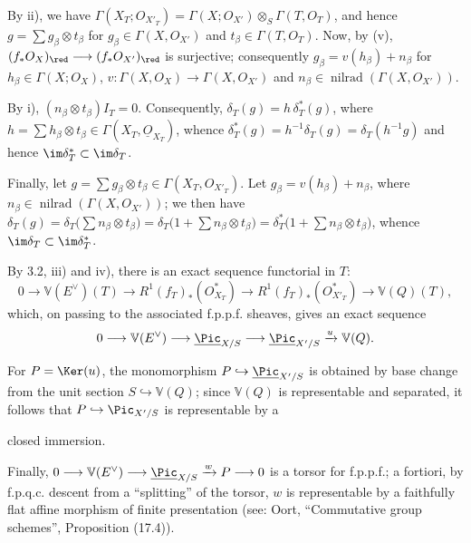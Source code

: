 By ii), we have \(\Gamma(X_T;{O}_{X'_T})=\Gamma(X;{O}_{X'})\otimes_S\Gamma(T,{O}_T)\), and hence \(g=\sum g_\beta\otimes t_\beta\) for \(g_\beta\in\Gamma(X,{O}_{X'})\) and \(t_\beta\in\Gamma(T,{O}_T)\). Now, by (v), \((f_*{O}_X)_{\red}\longrightarrow(f_*{O}_{X'})_{\red}\) is surjective; consequently \(g_\beta=v(h_\beta)+n_\beta\) for \(h_\beta\in\Gamma(X;{O}_X)\), \(v:\Gamma(X,{O}_X)\to
\Gamma(X,{O}_{X'})\) and \(n_\beta\in\operatorname{nilrad}(\Gamma(X,{O}_{X'}))\).

By i), \((n_\beta\otimes t_\beta)I_T=0\). Consequently, \(\delta_T(g)=h\,\delta_T^*(g)\), where \(h=\sum h_\beta\otimes t_\beta\in\Gamma(X_T,\underline{O}_{X_T})\), whence \(\delta_T^*(g)=h^{-1}\delta_T(g)=\delta_T(h^{-1}g)\) and hence \(\im\delta_T^*\subset\im\delta_T\).

Finally, let \(g=\sum g_\beta\otimes t_\beta\in
\Gamma(X_T,{O}_{X'_T})\). Let \(g_\beta=v(h_\beta)+n_\beta\), where \(n_\beta\in\operatorname{nilrad}(\Gamma(X,{O}_{X'}))\); we then have \(\delta_T(g)=\delta_T\bigl(\sum n_\beta\otimes t_\beta\bigr)=\delta_T\bigl(1+\sum n_\beta\otimes t_\beta\bigr)=\delta_T^*\bigl(1+\sum n_\beta\otimes t_\beta\bigr)\), whence \(\im\delta_T\subset\im\delta_T^*\).

By 3.2, iii) and iv), there is an exact sequence functorial in \(T\):
\[
  0\longrightarrow \mathbb V(E^\vee)(T)\longrightarrow
  R^1(f_T)_*({O}_{X_T}^{*})
  \longrightarrow
  R^1(f_T)_*({O}_{X'_T}^{*}) \longrightarrow \mathbb V(Q)(T),
\]
which, on passing to the associated f.p.p.f. sheaves, gives an exact sequence
\[
  0\longrightarrow \mathbb V(E^\vee)\longrightarrow\underline{\Pic}_{X/S}
  \longrightarrow\underline{\Pic}_{X'/S}\xrightarrow{u}\mathbb V(Q).
\]

For \(P=\Ker(u)\), the monomorphism \(P\hookrightarrow\underline{\Pic}_{X'/S}\) is obtained by base change from the unit section \(S\hookrightarrow\mathbb V(Q)\); since \(\mathbb V(Q)\) is representable and separated, it follows that \(P\hookrightarrow\Pic_{X'/S}\) is representable by a


%
closed immersion.

Finally, \(0\longrightarrow \mathbb V(E^\vee)\longrightarrow\underline{\Pic}_{X/S}\xrightarrow{w}P\longrightarrow0\) is a torsor for f.p.p.f.; a fortiori, by f.p.q.c. descent from a ``splitting'' of the torsor, \(w\) is representable by a faithfully flat affine morphism of finite presentation (see: Oort, ``Commutative group schemes'', Proposition (17.4)).

